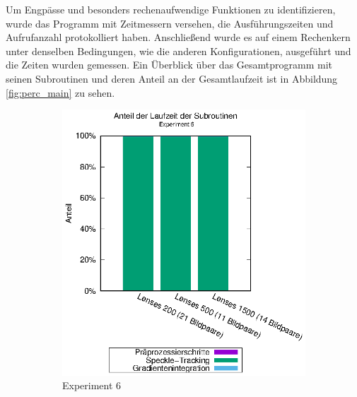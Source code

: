 Um Engpässe und besonders rechenaufwendige Funktionen zu identifizieren, wurde das Programm mit Zeitmessern versehen, die Ausführungszeiten und Aufrufanzahl protokolliert haben. Anschließend wurde es auf einem Rechenkern unter denselben Bedingungen, wie die anderen Konfigurationen, ausgeführt und die Zeiten wurden gemessen. Ein Überblick über das Gesamtprogramm mit seinen Subroutinen und deren Anteil an der Gesamtlaufzeit ist in Abbildung \ref{fig:perc_main} zu sehen.

\begin{center}
	\begin{figure}[h!]
		\begin{subfigure}[b]{0.5\textwidth}
			\centering
			\includegraphics[width=\textwidth]{pdf/main_exp6}
			\caption{Experiment 6}
			\label{fig:perc_main_exp6}
		\end{subfigure}
		\begin{subfigure}[b]{0.5\textwidth}
			\centering

\end{subfigure}
\end{figure}
\end{center}
